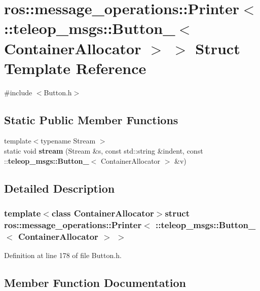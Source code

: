 \section{ros::message\_\-operations::Printer$<$ ::teleop\_\-msgs::Button\_\-$<$ ContainerAllocator $>$ $>$ Struct Template Reference}
\label{structros_1_1message__operations_1_1Printer_3_01_1_1teleop__msgs_1_1Button___3_01ContainerAllocator_01_4_01_4}


{\ttfamily \#include $<$Button.h$>$}

\subsection*{Static Public Member Functions}
\begin{DoxyCompactItemize}
\item 
{\footnotesize template$<$typename Stream $>$ }\\static void {\bf stream} (Stream \&s, const std::string \&indent, const ::{\bf teleop\_\-msgs::Button\_\-}$<$ ContainerAllocator $>$ \&v)
\end{DoxyCompactItemize}


\subsection{Detailed Description}
\subsubsection*{template$<$class ContainerAllocator$>$struct ros::message\_\-operations::Printer$<$ ::teleop\_\-msgs::Button\_\-$<$ ContainerAllocator $>$ $>$}



Definition at line 178 of file Button.h.



\subsection{Member Function Documentation}
